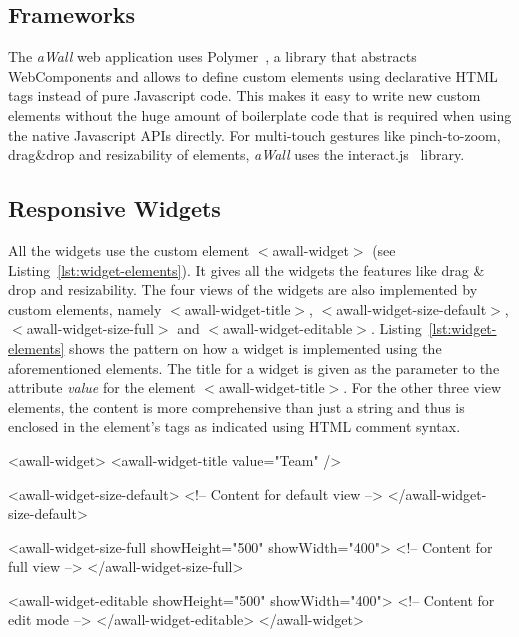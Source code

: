 \documentclass{sigchi}
\begin{document}
\newpage

\subsection{Frameworks}
The \textit{aWall} web application uses Polymer~\cite{polymer}, a library that abstracts WebComponents and allows to define custom elements using declarative HTML tags instead of pure Javascript code.
This makes it easy to write new custom elements without the huge amount of boilerplate code that is required when using the native Javascript APIs directly.
For multi-touch gestures like pinch-to-zoom, drag\&drop and resizability of elements, \textit{aWall} uses the interact.js~\cite{interactJs} library.

\subsection{Responsive Widgets}
All the widgets use the custom element $<$awall-widget$>$ (see Listing~\ref{lst:widget-elements}).
It gives all the widgets the features like drag \& drop and resizability.
The four views of the widgets are also implemented by custom elements, namely $<$awall-widget-title$>$, $<$awall-widget-size-default$>$, $<$awall-widget-size-full$>$ and $<$awall-widget-editable$>$.
Listing~\ref{lst:widget-elements} shows the pattern on how a widget is implemented using the aforementioned elements.
The title for a widget is given as the parameter to the attribute \textit{value} for the element $<$awall-widget-title$>$.
For the other three view elements, the content is more comprehensive than just a string and thus is enclosed in the element's tags as indicated using HTML comment syntax.

\begin{code}[caption={HTML elements for the widget's different views.},label=lst:widget-elements]
<awall-widget>
  <awall-widget-title value="Team" />

  <awall-widget-size-default>
    <!-- Content for default view -->
  </awall-widget-size-default>

  <awall-widget-size-full showHeight="500" showWidth="400">
    <!-- Content for full view -->
  </awall-widget-size-full>

  <awall-widget-editable showHeight="500" showWidth="400">
    <!-- Content for edit mode -->
  </awall-widget-editable>
</awall-widget>
\end{code}
\end{document}
